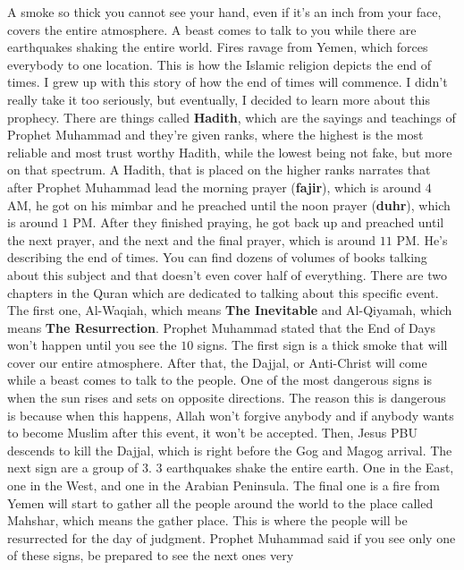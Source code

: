 \begin{essay}
  A smoke so thick you cannot see your hand, even if it's an inch from your
  face, covers the entire atmosphere. A beast comes to talk to you while there
  are earthquakes shaking the entire world. Fires ravage from Yemen, which
  forces everybody to one location. This is how the Islamic religion depicts the
  end of times. I grew up with this story of how the end of times will commence.
  I didn't really take it too seriously, but eventually, I decided to learn more
  about this prophecy. There are things called \textbf{Hadith}, which are the
  sayings and teachings of Prophet Muhammad and they're given ranks, where the
  highest is the most reliable and most trust worthy Hadith, while the lowest
  being not fake, but more on that spectrum. A Hadith, that is placed on the
  higher ranks narrates that after Prophet Muhammad lead the morning prayer
  (\textbf{fajir}), which is around $4$ AM, he got on his mimbar and he preached
  until the noon prayer (\textbf{duhr}), which is around $1$ PM. After they
  finished praying, he got back up and preached until the next prayer, and the
  next and the final prayer, which is around $11$ PM. He's describing the end of
  times. You can find dozens of volumes of books talking about this subject and
  that doesn't even cover half of everything. There are two chapters in the
  Quran which are dedicated to talking about this specific event. The first one,
  Al-Waqiah, which means \textbf{The Inevitable} and Al-Qiyamah, which means
  \textbf{The Resurrection}. Prophet Muhammad stated that the End of Days won't
  happen until you see the $10$ signs. The first sign is a thick smoke that will
  cover our entire atmosphere. After that, the Dajjal, or Anti-Christ will come
  while a beast comes to talk to the people. One of the most dangerous signs is
  when the sun rises and sets on opposite directions. The reason this is
  dangerous is because when this happens, Allah won't forgive anybody and if
  anybody wants to become Muslim after this event, it won't be accepted. Then,
  Jesus PBU descends to kill the Dajjal, which is right before the Gog and Magog
  arrival. The next sign are a group of $3$. $3$ earthquakes shake the entire
  earth. One in the East, one in the West, and one in the Arabian Peninsula. The
  final one is a fire from Yemen will start to gather all the people around the
  world to the place called Mahshar, which means the gather place. This is where
  the people will be resurrected for the day of judgment. Prophet Muhammad said
  if you see only one of these signs, be prepared to see the next ones very

\end{essay}
